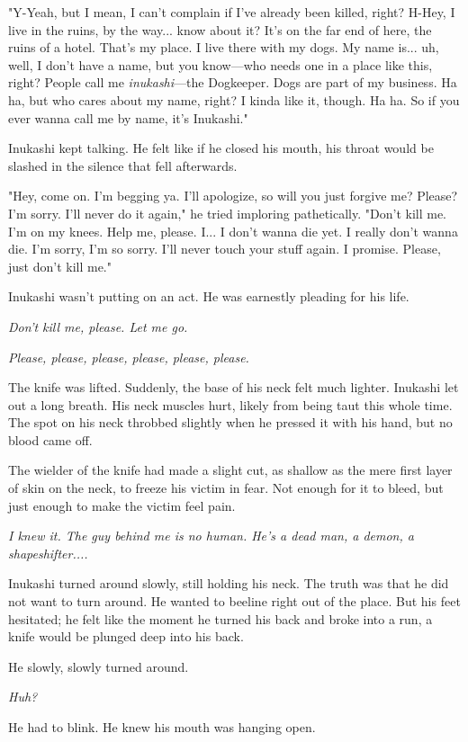 "Y-Yeah, but I mean, I can't complain if I've already been killed,
right? H-Hey, I live in the ruins, by the way... know about it? It's on
the far end of here, the ruins of a hotel. That's my place. I live there
with my dogs. My name is... uh, well, I don't have a name, but you
know---who needs one in a place like this, right? People call me
\emph{inukashi}---the Dogkeeper. Dogs are part of my business. Ha ha, but who
cares about my name, right? I kinda like it, though. Ha ha. So if you
ever wanna call me by name, it's Inukashi."

Inukashi kept talking. He felt like if he closed his mouth, his throat
would be slashed in the silence that fell afterwards.

"Hey, come on. I'm begging ya. I'll apologize, so will you just forgive
me? Please? I'm sorry. I'll never do it again," he tried imploring
pathetically. "Don't kill me. I'm on my knees. Help me, please. I... I
don't wanna die yet. I really don't wanna die. I'm sorry, I'm so sorry.
I'll never touch your stuff again. I promise. Please, just don't kill
me."

Inukashi wasn't putting on an act. He was earnestly pleading for his
life.

\emph{Don't kill me, please. Let me go.}

\emph{Please, please, please, please, please, please.}

The knife was lifted. Suddenly, the base of his neck felt much lighter.
Inukashi let out a long breath. His neck muscles hurt, likely from being
taut this whole time. The spot on his neck throbbed slightly when he
pressed it with his hand, but no blood came off.

The wielder of the knife had made a slight cut, as shallow as the mere
first layer of skin on the neck, to freeze his victim in fear. Not
enough for it to bleed, but just enough to make the victim feel pain.

\emph{I knew it. The guy behind me is no human. He's a dead man, a demon, a
shapeshifter....}

Inukashi turned around slowly, still holding his neck. The truth was
that he did not want to turn around. He wanted to beeline right out of
the place. But his feet hesitated; he felt like the moment he turned his
back and broke into a run, a knife would be plunged deep into his back.

He slowly, slowly turned around.

\emph{Huh?}

He had to blink. He knew his mouth was hanging open.

